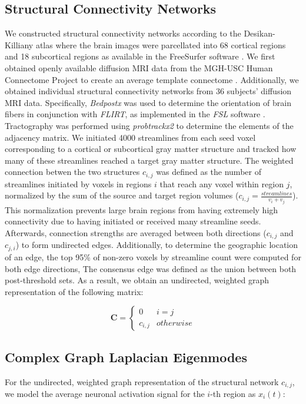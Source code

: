 \documentclass{article}
\begin{document}
\subsection{Structural Connectivity Networks} We constructed structural connectivity networks according to the Desikan-Killiany atlas where the brain images were parcellated into 68 cortical regions and 18 subcortical regions as available in the FreeSurfer software \cite{Fischl2002, Desikan2006}. We first obtained openly available diffusion MRI data from the MGH-USC Human Connectome Project to create an average template connectome \cite{McNab2013}. Additionally, we obtained individual structural connectivity networks from 36 subjects' diffusion MRI data. Specifically, \textit{Bedpostx} was used to determine the orientation of brain fibers in conjunction with \textit{FLIRT}, as implemented in the \textit{FSL} software \cite{Jenkinson2012}. Tractography was performed using \textit{probtrackx2} to determine the elements of the adjacency matrix. We initiated 4000 streamlines from each seed voxel corresponding to a cortical or subcortical gray matter structure and tracked how many of these streamlines reached a target gray matter structure. The weighted connection betwen the two structures $c_{i,j}$ was defined as the number of streamlines initiated by voxels in regions $i$ that reach any voxel within region $j$, normalized by the sum of the source and target region volumes ($c_{i,j} = \frac{streamlines}{v_i + v_j}$). This normalization prevents large brain regions from having extremely high connectivity due to having initiated or received many streamline seeds. Afterwards, connection strengths are averaged between both directions ($c_{i,j}$ and $c_{j,i}$) to form undirected edges. Additionally, to determine the geographic location of an edge, the top 95\% of non-zero voxels by streamline count were computed for both edge directions, The consensus edge was defined as the union between both post-threshold sets. As a result, we obtain an undirected, weighted graph representation of the following matrix:

\[ \mathbf{C} = \begin{cases}
    0 & i = j\\
    c_{i,j} & otherwise
    \end{cases}
    \]

\subsection{Complex Graph Laplacian Eigenmodes}
For the undirected, weighted graph representation of the structural network $c_{i,j}$, we model the average neuronal activation signal for the $i$-th region as $x_{i}(t)$:
\end{document}
